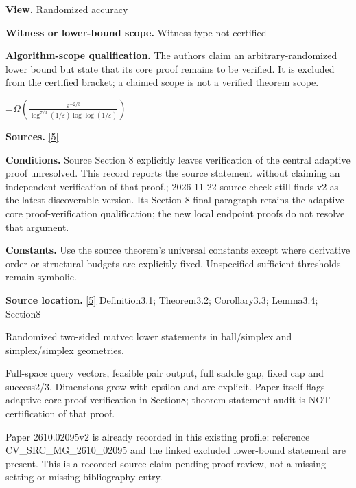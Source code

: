 \documentclass[10pt,a4paper]{article}
\newcommand{\AtlasMath}[1]{\par\begingroup\centering\setbox0=\hbox{$\displaystyle #1$}\ifdim\wd0>1.4\linewidth\typeout{ATLAS WIDE FORMULA: \the\wd0}\fi\ifdim\wd0>\linewidth\resizebox{\linewidth}{!}{\box0}\else\box0\fi\par\endgroup}
\begin{document}
\textbf{View.} Randomized accuracy



\textbf{Witness or lower-bound scope.} Witness type not certified



\textbf{Algorithm-scope qualification.} The authors claim an arbitrary-randomized lower bound but state that its core proof remains to be verified. It is excluded from the certified bracket; a claimed scope is not a verified theorem scope.



\AtlasMath{\Omega\!\left(\frac{\varepsilon^{-2/3}}{\log^{7/3}(1/\varepsilon)\log\log(1/\varepsilon)}\right)}


\textbf{Sources.} \href{https://arxiv.org/pdf/2610.02095v2}{[5]}



\textbf{Conditions.} Source Section 8 explicitly leaves verification of the central adaptive proof unresolved. This record reports the source statement without claiming an independent verification of that proof.; 2026-11-22 source check still finds v2 as the latest discoverable version. Its Section 8 final paragraph retains the adaptive-core proof-verification qualification; the new local endpoint proofs do not resolve that argument.



\textbf{Constants.} Use the source theorem’s universal constants except where derivative order or structural budgets are explicitly fixed. Unspecified sufficient thresholds remain symbolic.



\textbf{Source location.} \href{https://arxiv.org/pdf/2610.02095v2}{[5]} Definition3.1; Theorem3.2; Corollary3.3; Lemma3.4; Section8



Randomized two-sided matvec lower statements in ball/simplex and simplex/simplex geometries.



Full-space query vectors, feasible pair output, full saddle gap, fixed cap and success2/3. Dimensions grow with epsilon and are explicit. Paper itself flags adaptive-core proof verification in Section8; theorem statement audit is NOT certification of that proof.



Paper 2610.02095v2 is already recorded in this existing profile: reference CV\_SRC\_MG\_2610\_02095 and the linked excluded lower-bound statement are present. This is a recorded source claim pending proof review, not a missing setting or missing bibliography entry.
\end{document}
